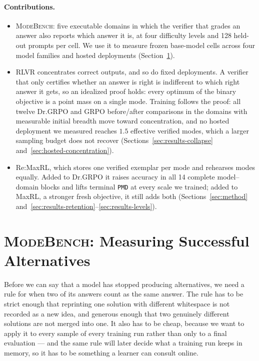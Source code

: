 \documentclass{article}
\newcommand{\1}{\mathbf 1}
\newcommand{\mb}{\textsc{ModeBench}}
\newcommand{\pmd}{\texttt{PMD}}
\theoremstyle{remark}
\theoremstyle{definition}
\theoremstyle{plain}
\begin{document}
\paragraph{Contributions.}
\begingroup
\setlength{\leftmargini}{1.1em}
\begin{itemize}
\setlength{\itemsep}{1pt}\setlength{\parskip}{0pt}\setlength{\parsep}{0pt}\setlength{\topsep}{2pt}
\item \mb{}: five executable domains in which the verifier that grades an answer
also reports which answer it is, at four difficulty levels and 128 held-out
prompts per cell. We use it to measure \MDcells{} frozen base-model cells across
four model families and \MDfrontierdeployments{} hosted deployments
(Section~\ref{sec:modebench}).
\item RLVR concentrates correct outputs, and so do fixed deployments. A
verifier that only certifies whether an answer is right is indifferent to which
right answer it gets, so an idealized proof holds: every optimum of the binary
objective is a point mass on a single mode. Training follows the proof: all
twelve Dr.GRPO and GRPO before/after comparisons in the domains with measurable
initial breadth move toward concentration, and no hosted deployment we measured
reaches $1.5$ effective verified modes, which a larger sampling budget does not
recover
(Sections~\ref{sec:results-collapse} and~\ref{sec:hosted-concentration}).
\item Re:MaxRL, which stores one verified exemplar per mode and rehearses modes
equally. Added to Dr.GRPO it raises accuracy in all 14 complete model--domain
blocks and lifts terminal \pmd{} at every scale we trained; added to MaxRL, a
stronger fresh objective, it still adds both (Sections~\ref{sec:method}
and~\ref{sec:results-retention}--\ref{sec:results-levels}).
\end{itemize}
\endgroup

\section{\mb: Measuring Successful Alternatives}
\label{sec:modebench}
\label{sec:collapse}

Before we can say that a model has stopped producing alternatives, we need a
rule for when two of its answers count as the same answer. The rule has to be
strict enough that reprinting one solution with different whitespace is not
recorded as a new idea, and generous enough that two genuinely different
solutions are not merged into one. It also has to be cheap, because we want to
apply it to every sample of every training run rather than only to a final
evaluation --- and the same rule will later decide what a training run keeps in
memory, so it has to be something a learner can consult online.
\end{document}
